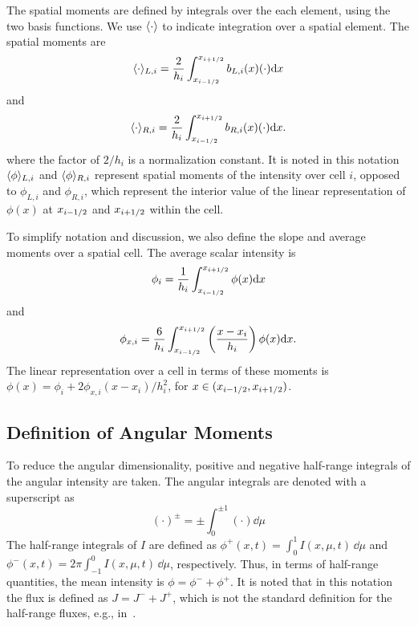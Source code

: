 The spatial moments are defined by integrals over the each element, using the two
basis functions.  We use $\langle \cdot \rangle$ to indicate integration over a
spatial element.  The spatial moments are
\begin{equation}\label{eq:x_moml}
\langle \cdot \rangle_{L,i} = \frac{2}{h_i} \int_{x_{i-1/2}}^{{x_{i+1/2}}} b_{L,i}(x) (\cdot) \mathrm{d} x
\end{equation}
and
\begin{equation}\label{eq:x_momr}
\langle \cdot \rangle_{R,i} = \frac{2}{h_i} \int_{x_{i-1/2}}^{{x_{i+1/2}}} b_{R,i}(x) (\cdot) \mathrm{d} x.
\end{equation}
where the factor of $2/h_i$ is a normalization constant.
It is noted in this notation $\langle \phi \rangle_{L,i}$ and
$\langle \phi \rangle_{R,i}$ represent spatial moments of the intensity over cell $i$, opposed
to $\phi_{L,i}$ and $\phi_{R,i}$, which represent the interior value of the linear
representation of $\phi(x)$ at $x_{{i-1/2}}$ and $x_{{i+1/2}}$ within the cell. 

To simplify notation and discussion, we also define the slope and average moments over a
spatial cell.  The average scalar intensity is
\begin{equation}
    \phi_i = \frac{1}{h_i} \int_{{x_{i-1/2}}}^{{x_{i+1/2}}} \phi(x) \mathrm{d} x
\end{equation}
and
\begin{equation}
    \phi_{x,i} = \frac{6}{h_i} \int_{{x_{i-1/2}}}^{{x_{i+1/2}}} \left(\frac{x-x_i}{h_i} \right)
    \phi(x) \mathrm{d} x . 
\end{equation}
The linear representation over a cell in terms of these moments is $\phi(x) = \phi_i
+ 2\phi_{x,i}(x - x_i)/h_i^2$, for $x\in({x_{i-1/2}},{x_{i+1/2}})$. 

\subsection{Definition of Angular Moments}

To reduce the angular dimensionality, positive and
negative half-range integrals of the angular intensity are taken.  The angular integrals
are denoted with a superscript as
\begin{equation}
    (\cdot)^\pm =  \pm\int_0^{\pm1} (\cdot) \dd \mu
\end{equation}
The half-range
integrals of $I$ are defined as $ \phi^+(x,t) = \int_0^{1} I(x,\mu,t)\, \dd \mu$ and $
\phi^-(x,t) = 2 \pi \int_{-1}^{0} I(x,\mu,t) \,\dd
\mu$, respectively.  Thus, in terms of half-range quantities, the mean intensity is $\phi = \phi^- +
\phi ^+$.  It is noted that in this notation the flux is defined as
$J=J^-+J^+$, which is not the standard definition for the half-range fluxes, e.g.,
in~\cite{lewis}.

